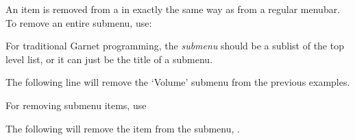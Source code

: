 An item is removed from a  in exactly the same way as
from a regular menubar.  To remove an entire submenu, use:


For traditional Garnet programming, the {\it submenu} should be a sublist
of the top level  list, or it can just be the title of a
submenu.

The following line will remove the `Volume' submenu from the previous
examples.


For removing submenu items, use


The following will remove the  item from the submenu, .



